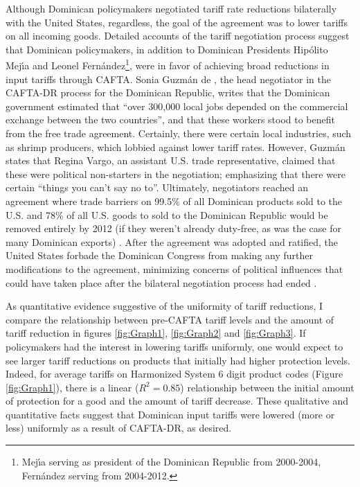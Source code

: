 Although Dominican policymakers negotiated tariff rate reductions bilaterally with the
United States, regardless, the goal of the agreement was to lower tariffs on all
incoming goods. Detailed accounts of the tariff negotiation process suggest that Dominican policymakers,
in addition to Dominican Presidents Hip\'{o}lito Mej\'{\i}a and Leonel Fern\'{a}ndez\footnote{Mej\'{\i}a
serving as president of the Dominican Republic from 2000-2004, Fern\'{a}ndez serving from 2004-2012.},
were in favor of achieving broad reductions in input tariffs through CAFTA. Sonia Guzm\'{a}n de 
\citeauthor{guzman}, 
the head negotiator in the CAFTA-DR process for the Dominican Republic, writes that the Dominican 
government estimated that ``over 300,000 local jobs depended
on the commercial exchange between the two countries'', and that these workers stood to benefit from the 
free trade agreement. Certainly, there were certain local industries, such as shrimp producers,
which lobbied against lower tariff rates. However, Guzm\'{a}n states that Regina Vargo, an 
assistant U.S. trade representative, claimed that these were political non-starters in the negotiation;
emphasizing that there were certain ``things you can't say no to''. Ultimately,
negotiators reached an agreement where trade barriers on 99.5\% of all Dominican products sold to 
the U.S. and 78\% of all U.S. goods to sold to the Dominican Republic would be removed entirely by 2012
(if they weren't already duty-free, as was the case for many Dominican exports) \citep{guzman}. 
After the agreement was adopted and ratified, the United States
forbade the Dominican Congress from making any further modifications to the agreement, 
minimizing concerns of political influences that could have taken place after the bilateral
negotiation process had ended \citep{usambassador}.

As quantitative evidence suggestive of the uniformity of tariff reductions, 
I compare the relationship between pre-CAFTA tariff
levels and the amount of tariff reduction in figures \ref{fig:Graph1}, \ref{fig:Graph2} and 
\ref{fig:Graph3}. If policymakers had the interest
in lowering tariffs uniformly, one would expect to see larger tariff reductions on products that
initially had higher protection levels. Indeed, for average tariffs on Harmonized System 
6 digit product codes (Figure \ref{fig:Graph1}), there is a linear ($R^2=0.85$) relationship 
between the initial amount of protection for a good and
the amount of tariff decrease. These qualitative and quantitative facts
suggest that Dominican input tariffs
were lowered (more or less) uniformly as a result of CAFTA-DR, as desired.